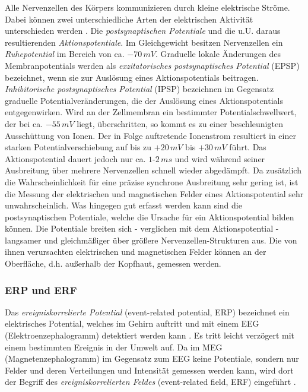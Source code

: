 \documentclass[doc,a4paper,12pt]{apa6}
\begin{document}
Alle Nervenzellen des Körpers kommunizieren durch kleine elektrische Ströme. Dabei können zwei unterschiedliche Arten der elektrischen Aktivität unterschieden werden \parencite{da1998biophysical}. Die \emph{postsynaptischen Potentiale} und die u.U. daraus resultierenden \emph{Aktionspotentiale}. Im Gleichgewicht besitzen Nervenzellen ein \emph{Ruhepotential} im Bereich von ca. $-70\,mV$. Graduelle lokale Änderungen des Membranpotentials werden als \emph{exzitatorisches postsynaptisches Potential} (EPSP) bezeichnet, wenn sie zur Auslösung eines Aktionspotentials beitragen. \emph{Inhibitorische postsynaptisches Potential} (IPSP) bezeichnen im Gegensatz graduelle Potentialveränderungen, die der Auslösung eines Aktionspotentials entgegenwirken. Wird an der Zellmembran ein bestimmter Potentialschwellwert, der bei ca. $-55\,mV$ liegt, überschritten, so kommt es zu einer beschleunigten Ausschüttung von Ionen. Der in Folge auftretende Ionenstrom resultiert in einer starken Potentialverschiebung auf bis zu $+20\,mV$ bis $+30\,mV$ führt. Das Aktionspotential dauert jedoch nur ca. $1$-$2\,ms$ und wird während seiner Ausbreitung über mehrere Nervenzellen schnell wieder abgedämpft. Da zusätzlich die Wahrscheinlichkeit für eine präzise synchrone Ausbreitung sehr gering ist, ist die Messung der elektrischen und magnetischen Felder eines Aktionspotential sehr unwahrscheinlich. Was hingegen gut erfasst werden kann sind die postsynaptischen Potentiale, welche die Ursache für ein Aktionspotential bilden können. Die Potentiale breiten sich - verglichen mit dem Aktionspotential - langsamer und gleichmäßiger über größere Nervenzellen-Strukturen aus. Die von ihnen verursachten elektrischen und magnetischen Felder können an der Oberfläche, d.h. außerhalb der Kopfhaut, gemessen werden.

\subsubsection{ERP und ERF}
\label{sec:erf}

Das \emph{ereigniskorrelierte Potential} (event-related potential, ERP) bezeichnet ein elektrisches Potential, welches im Gehirn auftritt und mit einem EEG (Elektroenzephalogramm) detektiert werden kann \parencite{luck2014introduction}. Es tritt leicht verzögert mit einem bestimmten Ereignis in der Umwelt auf. Da im MEG (Magnetenzephalogramm) im Gegensatz zum EEG keine Potentiale, sondern nur Felder und deren Verteilungen und Intensität gemessen werden kann, wird dort der Begriff des \emph{ereigniskorrelierten Feldes} (event-related field, ERF) eingeführt \parencite{brown1999neurocognition}.
\end{document}
